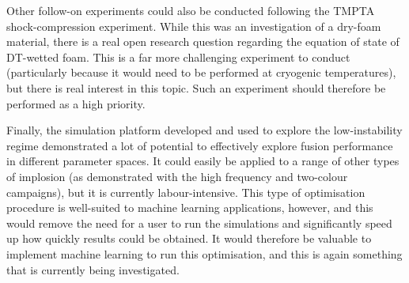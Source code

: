 Other follow-on experiments could also be conducted following the TMPTA shock-compression experiment. While this was an investigation of a dry-foam material, there is a real open research question regarding the equation of state of DT-wetted foam. This is a far more challenging experiment to conduct (particularly because it would need to be performed at cryogenic temperatures), but there is real interest in this topic. Such an experiment should therefore be performed as a high priority.

Finally, the simulation platform developed and used to explore the low-instability regime demonstrated a lot of potential to effectively explore fusion performance in different parameter spaces. It could easily be applied to a range of other types of implosion (as demonstrated with the high frequency and two-colour campaigns), but it is currently labour-intensive. This type of optimisation procedure is well-suited to machine learning applications, however, and this would remove the need for a user to run the simulations and significantly speed up how quickly results could be obtained. It would therefore be valuable to implement machine learning to run this optimisation, and this is again something that is currently being investigated.